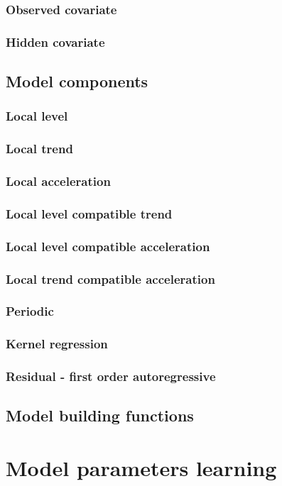 \documentclass{book}
\begin{document}
\subsection{Observed covariate}
\subsection{Hidden covariate}
\section{Model components}
\subsection{Local level}
\subsection{Local trend}
\subsection{Local acceleration}
\subsection{Local level compatible trend}
\subsection{Local level compatible acceleration}
\subsection{Local trend compatible acceleration}
\subsection{Periodic}
\subsection{Kernel regression}
\subsection{Residual - first order autoregressive}
\section{Model building functions}
\newpage

\chapter{Model parameters learning}
\end{document}
